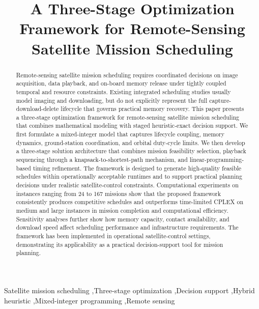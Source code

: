 \documentclass[preprint,3p,12pt,authoryear]{elsarticle}
\begin{document}
\begin{frontmatter}

\title{A Three-Stage Optimization Framework for Remote-Sensing Satellite Mission Scheduling}

\begin{abstract}
Remote-sensing satellite mission scheduling requires coordinated decisions on image acquisition, data playback, and on-board memory release under tightly coupled temporal and resource constraints. Existing integrated scheduling studies usually model imaging and downloading, but do not explicitly represent the full capture-download-delete lifecycle that governs practical memory recovery. This paper presents a three-stage optimization framework for remote-sensing satellite mission scheduling that combines mathematical modeling with staged heuristic-exact decision support. We first formulate a mixed-integer model that captures lifecycle coupling, memory dynamics, ground-station coordination, and orbital duty-cycle limits. We then develop a three-stage solution architecture that combines mission feasibility selection, playback sequencing through a knapsack-to-shortest-path mechanism, and linear-programming-based timing refinement. The framework is designed to generate high-quality feasible schedules within operationally acceptable runtimes and to support practical planning decisions under realistic satellite-control constraints. Computational experiments on instances ranging from 24 to 167 missions show that the proposed framework consistently produces competitive schedules and outperforms time-limited CPLEX on medium and large instances in mission completion and computational efficiency. Sensitivity analyses further show how memory capacity, contact availability, and download speed affect scheduling performance and infrastructure requirements. The framework has been implemented in operational satellite-control settings, demonstrating its applicability as a practical decision-support tool for mission planning.
\end{abstract}

\begin{keyword}
Satellite mission scheduling \sep Three-stage optimization \sep Decision support \sep Hybrid heuristic \sep Mixed-integer programming \sep Remote sensing
\end{keyword}

\end{frontmatter}

\end{document}
